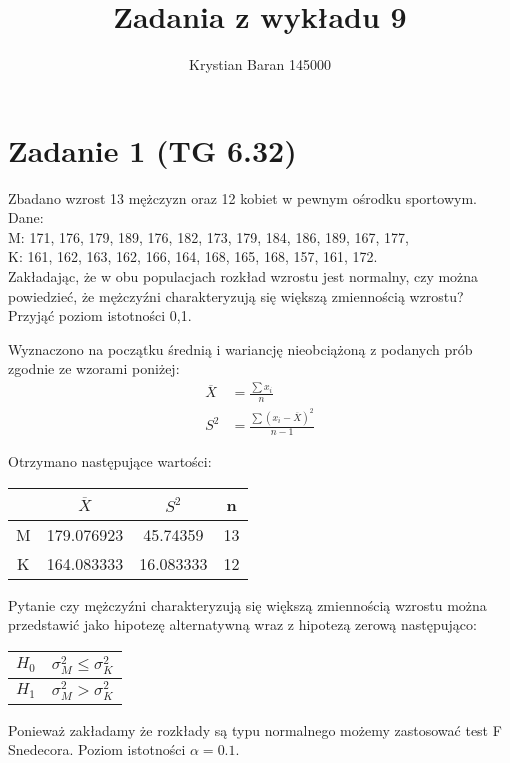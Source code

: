 \documentclass{article}
\author{Krystian Baran 145000}
\title{Zadania z wykładu 9}
\begin{document}
\maketitle
\newpage

\tableofcontents
\newpage

\section{Zadanie 1 (TG 6.32)}
Zbadano wzrost 13 mężczyzn oraz 12 kobiet w pewnym ośrodku sportowym. Dane: \\
M: 171, 176, 179, 189, 176, 182, 173, 179, 184, 186, 189, 167, 177, \\
K: 161, 162, 163, 162, 166, 164, 168, 165, 168, 157, 161, 172. \\
Zakładając, że w obu populacjach rozkład wzrostu jest normalny, czy można powiedzieć, że mężczyźni charakteryzują się większą zmiennością wzrostu? Przyjąć poziom istotności 0,1. \\ \par

Wyznaczono na początku średnią i wariancję nieobciążoną z podanych prób zgodnie ze wzorami poniżej:
\begin{align*}
\overline{X} & = \frac{\sum x_i}{n} \\
S^2 &= \frac{\sum (x_i - \overline{X})^2 }{n-1}
\end{align*}

Otrzymano następujące wartości:
\begin{center} \begin{tabular}{|c|c|c|c|} \hline
 & $\overline{X}$ & $S^2$ & n \\ \hline
M & 179.076923 & 45.74359 & 13\\ \hline
K & 164.083333 & 16.083333 & 12\\ \hline
\end{tabular} \end{center}

Pytanie czy mężczyźni charakteryzują się większą zmiennością wzrostu można przedstawić jako hipotezę alternatywną wraz z hipotezą zerową następująco:
\begin{center} \begin{tabular}{|c|c|} \hline
$H_0$ & $\sigma^2_M \leq \sigma^2_K$ \\ \hline
$H_1$ & $\sigma^2_M > \sigma^2_K$ \\ \hline
\end{tabular} \end{center}
Ponieważ zakładamy że rozkłady są typu normalnego możemy zastosować test F Snedecora. Poziom istotności $\alpha = 0.1$.
\end{document}
